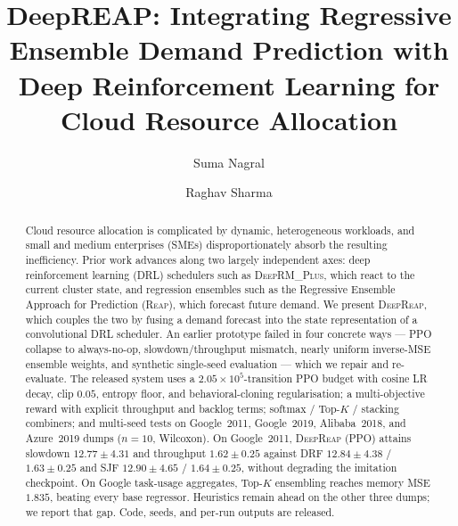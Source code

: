 \documentclass[runningheads]{llncs}
\newcommand{\reap}{\textsc{Reap}}
\newcommand{\deeprm}{\textsc{DeepRM\_Plus}}
\newcommand{\deepreap}{\textsc{DeepReap}}
\begin{document}
\title{DeepREAP: Integrating Regressive Ensemble Demand Prediction with Deep Reinforcement Learning for Cloud Resource Allocation}

\author{Suma Nagral \and Raghav Sharma}


\maketitle

\begin{abstract}
Cloud resource allocation is complicated by dynamic, heterogeneous
workloads, and small and medium enterprises (SMEs) disproportionately
absorb the resulting inefficiency. Prior work advances along two
largely independent axes: deep reinforcement learning (DRL) schedulers
such as \deeprm{}, which react to the current cluster state, and
regression ensembles such as the Regressive Ensemble Approach for
Prediction (\reap{}), which forecast future demand. We present
\deepreap{}, which couples the two by fusing a demand forecast into the
state representation of a convolutional DRL scheduler. An earlier
prototype failed in four concrete ways --- PPO collapse to always-no-op,
slowdown/throughput mismatch, nearly uniform inverse-MSE ensemble
weights, and synthetic single-seed evaluation --- which we repair and
re-evaluate. The released system uses a $2.05{\times}10^5$-transition
PPO budget with cosine LR decay, clip $0.05$, entropy floor, and
behavioral-cloning regularisation; a multi-objective reward with
explicit throughput and backlog terms; softmax / Top-$K$ / stacking
combiners; and multi-seed tests on Google~2011, Google~2019,
Alibaba~2018, and Azure~2019 dumps ($n{=}10$, Wilcoxon). On Google~2011,
\deepreap{} (PPO) attains slowdown $12.77{\pm}4.31$ and throughput
$1.62{\pm}0.25$ against DRF $12.84{\pm}4.38$ / $1.63{\pm}0.25$ and SJF
$12.90{\pm}4.65$ / $1.64{\pm}0.25$, without degrading the imitation
checkpoint. On Google task-usage aggregates, Top-$K$ ensembling reaches
memory MSE $1.835$, beating every base regressor. Heuristics remain
ahead on the other three dumps; we report that gap. Code, seeds, and
per-run outputs are released.
\end{abstract}
\end{document}
